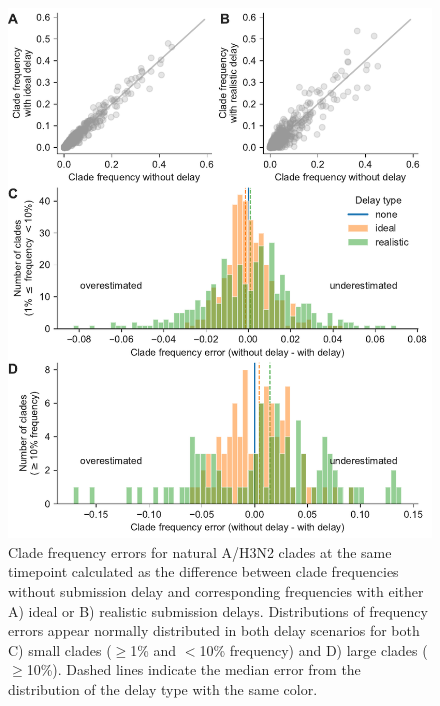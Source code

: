 \documentclass[9pt,lineno]{elife}
\begin{document}
\begin{figure}[htb]
\includegraphics[width=\linewidth]{figures/h3n2_current_frequency_errors_by_delay}
\caption{Clade frequency errors for natural A/H3N2 clades at the same timepoint calculated as the difference between clade frequencies without submission delay and corresponding frequencies with either A) ideal or B) realistic submission delays.
Distributions of frequency errors appear normally distributed in both delay scenarios for both C) small clades ($\ge$1\% and $<$10\% frequency) and D) large clades ($\ge$10\%).
Dashed lines indicate the median error from the distribution of the delay type with the same color.}
\label{fig:h3n2_current_clade_frequency_errors}
%

\end{figure}
\end{document}
